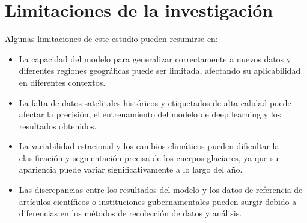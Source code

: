 \section{Limitaciones de la investigación}
Algunas limitaciones de este estudio pueden resumirse en:
\begin{itemize}
	
	
	
	
	
	
	\item La capacidad del modelo para generalizar correctamente a nuevos datos y diferentes regiones geográficas puede ser limitada, afectando su aplicabilidad en diferentes contextos.
	\item La falta de datos satelitales históricos y etiquetados de alta calidad puede afectar la precisión, el entrenamiento del modelo de deep learning y los resultados obtenidos.
	\item La variabilidad estacional y los cambios climáticos pueden dificultar la clasificación y segmentación precisa de los cuerpos glaciares, ya que su apariencia puede variar significativamente a lo largo del año.
	\item Las discrepancias entre los resultados del modelo y los datos de referencia de artículos científicos o instituciones gubernamentales pueden surgir debido a diferencias en los métodos de recolección de datos y análisis.
	
\end{itemize}

